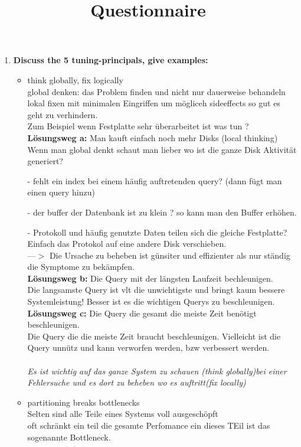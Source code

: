 \documentclass[12pt]{article}\pagestyle{myheadings}
\title{Questionnaire}
\theoremstyle{plain}
\begin{document}
\begin{enumerate}

\item \textbf{Discuss the 5 tuning-principals, give examples:} \\
\begin{itemize}
\item think globally, fix logically\\
global denken: das Problem finden und nicht nur dauerweise behandeln\\
lokal fixen mit minimalen Eingriffen um mögliceh sideeffects so gut es geht zu verhindern.\\
Zum Beispiel wenn Festplatte sehr überarbeitet ist was tun ?
\textbf{Lösungsweg a:} Man kauft einfach noch mehr Disks (local thinking)\\
Wenn man global denkt schaut man lieber wo ist die ganze Disk Aktivität generiert?\\
\item[-]fehlt ein index bei einem häufig auftretenden query? (dann fügt man einen query hinzu)
\item[-]der buffer der Datenbank ist zu klein ? so kann man den Buffer erhöhen.
\item[-]Protokoll und häufig genutzte Daten teilen sich die gleiche Festplatte? Einfach das Protokol auf eine andere Disk verschieben.\\
---$>$ Die Ursache zu beheben ist günsiter und effizienter als nur ständig die Symptome zu bekämpfen.\\
\textbf{Lösungsweg b:} Die Query mit der längsten Laufzeit bechleunigen.\\
Die langsamste Query ist vlt die unwichtigste und bringt kaum bessere Systemleistung! Besser ist es die wichtigen Querys zu beschleunigen.\\
\textbf{Lösungsweg c:} Die Query die gesamt die meiste Zeit benötigt beschleunigen.\\Die Query die die meiste Zeit braucht beschleunigen.
Vielleicht ist die Query unnütz und kann verworfen werden, bzw verbessert werden.\\ \\
\textit{Es ist wichtig auf das ganze System zu schauen (think globally)bei einer Fehlersuche und es dort zu beheben wo es auftritt(fix locally)}
\item partitioning breaks bottlenecks \\
Selten sind alle Teile eines Systems voll ausgeschöpft\\
oft schränkt ein teil die gesamte Perfomance ein dieses TEil ist das sogenannte Bottleneck.\\

\end{itemize}
\end{enumerate}
\end{document}
